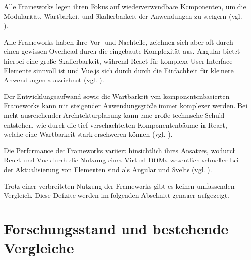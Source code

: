 \documentclass[oneside]{ausarbeitung}
\begin{document}
Alle Frameworks legen ihren Fokus auf wiederverwendbare Komponenten, um die Modularität, Wartbarkeit und Skalierbarkeit der Anwendungen zu steigern (vgl. \autocite [S. 7]{spa-frameworks-2024}). 

Alle Frameworks haben ihre Vor- und Nachteile, zeichnen sich aber oft durch einen gewissen Overhead durch die eingebaute Komplexität aus. Angular bietet hierbei eine große Skalierbarkeit, während React für komplexe User Interface Elemente sinnvoll ist und Vue.js sich durch durch die Einfachheit für kleinere Anwendungen auszeichnet (vgl. \parencite[S. 4]{frontend_frameworks_comparison}). 

Der Entwicklungsaufwand sowie die Wartbarkeit von komponentenbasierten Frameworks kann mit steigender Anwendungsgröße immer komplexer werden. Bei nicht ausreichender Architekturplanung kann eine große technische Schuld entstehen, wie durch die tief verschachtelten Komponentenbäume in React, welche eine Wartbarkeit stark erschweren können (vgl. \parencite[S. 29]{comparison-frameworks-scalable-apps}).

Die Performance der Frameworks variiert hinsichtlich ihres Ansatzes, wodurch React und Vue durch die Nutzung eines Virtual DOMs wesentlich schneller bei der Aktualisierung von Elementen sind als Angular und Svelte (vgl. \parencite[S. 61]{js-framework-comparison}).

Trotz einer verbreiteten Nutzung der Frameworks gibt es keinen umfassenden Vergleich. Diese Defizite werden im folgenden Abschnitt genauer aufgezeigt. 

\section{Forschungsstand und bestehende Vergleiche}
\end{document}

